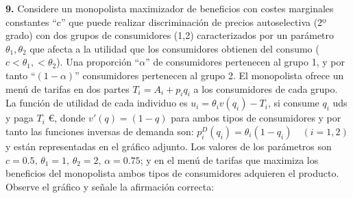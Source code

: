 \documentclass{nuevotema}
\begin{document}


\preguntas


\textbf{9.} Considere un monopolista maximizador de beneficios con costes marginales constantes ``c'' que puede realizar discriminación de precios autoselectiva (2º grado) con dos grupos de consumidores (1,2) caracterizados por un parámetro $\theta_1, \theta_2$ que afecta a la utilidad que los consumidores obtienen del consumo ($c < \theta_1, < \theta_2$). Una proporción ``$\alpha$'' de consumidores pertenecen al grupo 1, y por tanto ``$(1-\alpha)$'' consumidores pertenecen al grupo 2. El monopolista ofrece un menú de tarifas en dos partes $T_i = A_i + p_i q_i$ a los consumidores de cada grupo. La función de utilidad de cada individuo es $u_i = \theta_i v (q_i) - T_i$, si consume $q_i$ uds y paga $T_i$ €, donde $v'(q) = (1-q)$ para ambos tipos de consumidores y por tanto las funciones inversas de demanda son: $p_i^D(q_i) = \theta_i (1-q_i) \quad (i = 1,2)$ y están representadas en el gráfico adjunto. Los valores de los parámetros son $c = 0.5, \, \theta_1 = 1, \, \theta_2 = 2, \, \alpha = 0.75$; y en el menú de tarifas que maximiza los beneficios del monopolista ambos tipos de consumidores adquieren el producto. Observe el gráfico y señale la afirmación correcta:
\end{document}
